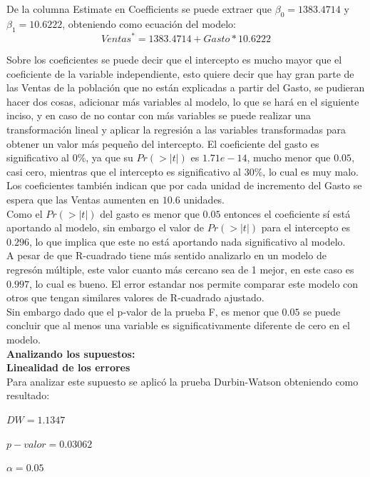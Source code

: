 \documentclass[12pt,a4paper]{article}
\begin{document}
	De la columna Estimate en Coefficients se puede extraer que $\beta_0=1383.4714$ y $\beta_1=10.6222$, obteniendo como ecuación del modelo:
	\begin{equation*}
	{Ventas}^{*} = 1383.4714 + Gasto * 10.6222
	\end{equation*}
	
	Sobre los coeficientes se puede decir que el intercepto es mucho mayor que el coeficiente de la variable independiente, esto quiere decir que hay gran parte de las Ventas de la población que no están explicadas a partir del Gasto, se pudieran hacer dos cosas, adicionar más variables al modelo, lo que se hará en el siguiente inciso, y en caso de no contar con más variables se puede realizar una transformación lineal y aplicar la regresión a las variables transformadas para obtener un valor más pequeño del intercepto. 
	El coeficiente del gasto es significativo al $0\%$, ya que su $Pr(>|t|)$ es $1.71e-14$, mucho menor que $0.05$, casi cero, mientras que el intercepto es significativo al $30\%$, lo cual es muy malo. Los coeficientes también indican que por cada unidad de incremento del Gasto se espera que las Ventas aumenten en $10.6$ unidades.\\
	
	Como el $Pr(>|t|)$ del gasto es menor que $0.05$ entonces el coeficiente sí está aportando al modelo, sin embargo el valor de $Pr(>|t|)$ para el intercepto es $0.296$, lo que implica que este no está aportando nada significativo al modelo.\\
	
	A pesar de que R-cuadrado tiene más sentido analizarlo en un modelo de regresón múltiple, este valor cuanto más cercano sea de 1 mejor, en este caso es $0.997$, lo cual es bueno. El error estandar nos permite comparar este modelo con otros que tengan similares valores de R-cuadrado ajustado.\\ 
	
	Sin embargo dado que el p-valor de la prueba F, es menor que $0.05$ se puede concluir que al menos una variable es significativamente diferente de cero en el modelo.\\
	
	\textbf{Analizando los supuestos:}\\
	
	\textbf{Linealidad de los errores}\\
	Para analizar este supuesto se aplicó la prueba  Durbin-Watson obteniendo como resultado:
	 
	\begin{center}
		$DW = 1.1347$
		
		$p-valor = 0.03062$
		
		$\alpha = 0.05$
	\end{center}
	
\end{document}

